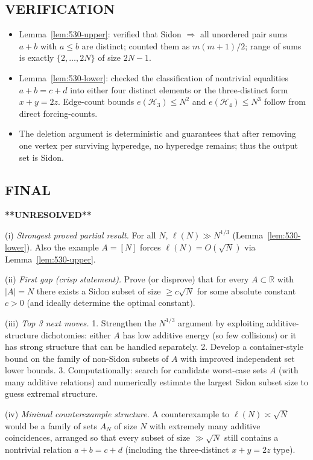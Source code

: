 \subsection*{VERIFICATION}
\begin{itemize}
\item Lemma~\ref{lem:530-upper}: verified that Sidon $\Rightarrow$ all unordered pair sums $a+b$ with $a\le b$ are distinct; counted them as $m(m+1)/2$; range of sums is exactly $\{2,\dots,2N\}$ of size $2N-1$.
\item Lemma~\ref{lem:530-lower}: checked the classification of nontrivial equalities $a+b=c+d$ into either four distinct elements or the three-distinct form $x+y=2z$. Edge-count bounds $e(\mathcal H_3)\le N^2$ and $e(\mathcal H_4)\le N^3$ follow from direct forcing-counts.
\item The deletion argument is deterministic and guarantees that after removing one vertex per surviving hyperedge, no hyperedge remains; thus the output set is Sidon.
\end{itemize}

\subsection*{FINAL}
\textbf{**UNRESOLVED**}

(i) \emph{Strongest proved partial result.} For all $N$, $\ell(N)\gg N^{1/3}$ (Lemma~\ref{lem:530-lower}). Also the example $A=[N]$ forces $\ell(N)=O(\sqrt N)$ via Lemma~\ref{lem:530-upper}.

(ii) \emph{First gap (crisp statement).} Prove (or disprove) that for every $A\subset\mathbb R$ with $|A|=N$ there exists a Sidon subset of size $\ge c\sqrt N$ for some absolute constant $c>0$ (and ideally determine the optimal constant).

(iii) \emph{Top 3 next moves.}
1. Strengthen the $N^{1/3}$ argument by exploiting additive-structure dichotomies: either $A$ has low additive energy (so few collisions) or it has strong structure that can be handled separately.
2. Develop a container-style bound on the family of non-Sidon subsets of $A$ with improved independent set lower bounds.
3. Computationally: search for candidate worst-case sets $A$ (with many additive relations) and numerically estimate the largest Sidon subset size to guess extremal structure.

(iv) \emph{Minimal counterexample structure.} A counterexample to $\ell(N)\asymp \sqrt N$ would be a family of sets $A_N$ of size $N$ with extremely many additive coincidences, arranged so that every subset of size $\gg \sqrt N$ still contains a nontrivial relation $a+b=c+d$ (including the three-distinct $x+y=2z$ type).



